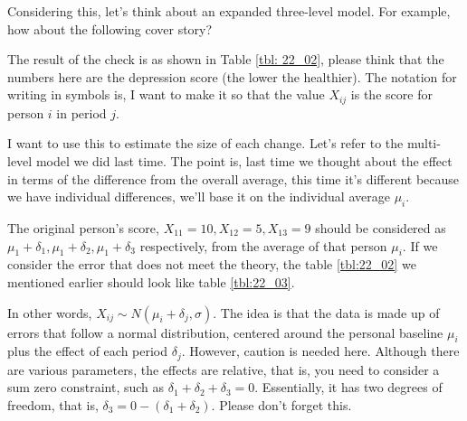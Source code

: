 \documentclass{ltjsbook}
\begin{document}
Considering this, let's think about an expanded three-level model. For example, how about the following cover story?


The result of the check is as shown in Table \ref{tbl: 22_02}, please think that the numbers here are the depression score (the lower the healthier).
The notation for writing in symbols is, I want to make it so that the value $X_{ij}$ is the score for person $i$ in period $j$.

I want to use this to estimate the size of each change. Let's refer to the multi-level model we did last time. The point is, last time we thought about the effect in terms of the difference from the overall average, this time it's different because we have individual differences, we'll base it on the individual average $\mu_i$.

The original person's score, $X_{11}=10,X_{12}=5,X_{13}=9$ should be considered as $\mu_1+\delta_1,\mu_1+\delta_2,\mu_1+\delta_3$ respectively, from the average of that person $\mu_i$. If we consider the error that does not meet the theory, the table \ref{tbl:22_02} we mentioned earlier should look like table \ref{tbl:22_03}.


In other words, $X_{ij}\sim N(\mu_i+\delta_j,\sigma)$. The idea is that the data is made up of errors that follow a normal distribution, centered around the personal baseline $\mu_i$ plus the effect of each period $\delta_j$.
However, caution is needed here. Although there are various parameters, the effects are relative, that is, you need to consider a sum zero constraint, such as $\delta_1+\delta_2+\delta_3=0$. Essentially, it has two degrees of freedom, that is, $\delta_3=0-(\delta_1+\delta_2)$. Please don't forget this.
\end{document}

